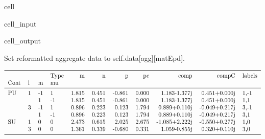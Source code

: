 \documentclass[letterpaper,table,10pt,english]{jupyterBook}
\begin{document}
\begin{sphinxuseclass}{cell}\begin{sphinxVerbatimInput}

\begin{sphinxuseclass}{cell_input}
\begin{sphinxVerbatim}[commandchars=\\\{\}]
  
\PYG{p}{[}\PYG{p}{]}\PYG{p}{[}\PYG{p}{]}
\end{sphinxVerbatim}

\end{sphinxuseclass}\end{sphinxVerbatimInput}
\begin{sphinxVerbatimOutput}

\begin{sphinxuseclass}{cell_output}
\begin{sphinxVerbatim}[commandchars=\\\{\}]
Set reformatted aggregate data to self.data[agg][matEpd].
\end{sphinxVerbatim}
\begin{equation*}
\begin{split}\begin{tabular}{llllrrrrrrl}
\toprule
   &   &    & Type &      m &      n &      p &     pc &          comp &         compC & labels \\
Cont & l & m & mu &        &        &        &        &               &               &        \\
\midrule
PU & 1 & -1 &  1 &  1.815 &  0.451 & -0.861 &  0.000 &  1.183-1.377j &  0.451+0.000j &   1,-1 \\
   &   &  1 & -1 &  1.815 &  0.451 & -0.861 &  0.000 &  1.183-1.377j &  0.451+0.000j &    1,1 \\
   & 3 & -1 &  1 &  0.896 &  0.223 &  0.123 &  1.794 &  0.889+0.110j & -0.049+0.217j &   3,-1 \\
   &   &  1 & -1 &  0.896 &  0.223 &  0.123 &  1.794 &  0.889+0.110j & -0.049+0.217j &    3,1 \\
SU & 1 &  0 &  0 &  2.473 &  0.615 &  2.025 &  2.675 & -1.085+2.222j & -0.550+0.277j &    1,0 \\
   & 3 &  0 &  0 &  1.361 &  0.339 & -0.680 &  0.331 &  1.059-0.855j &  0.320+0.110j &    3,0 \\
\bottomrule
\end{tabular}\end{split}
\end{equation*}
\end{sphinxuseclass}\end{sphinxVerbatimOutput}

\end{sphinxuseclass}
\end{document}
